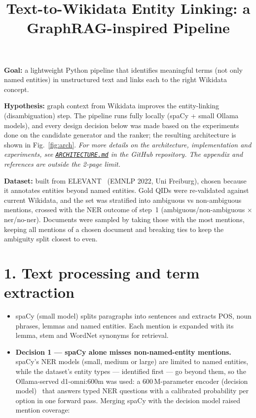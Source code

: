 \documentclass[10pt,a4paper]{article}
\title{\vspace{-1.4cm}\large\bfseries Text-to-Wikidata Entity Linking: a GraphRAG-inspired Pipeline}
\author{}
\date{}
\begin{document}
\maketitle
\vspace{-1.6cm}

\textbf{Goal:} a lightweight Python pipeline that identifies meaningful terms (not only named entities) in unstructured text and links each to the right Wikidata concept. 

\textbf{Hypothesis:} graph context from Wikidata improves the entity-linking (disambiguation) step. The pipeline runs fully locally (spaCy + small Ollama models), and every design decision below was made based on the experiments done on the candidate generator and the ranker; the resulting architecture is shown in Fig.~\ref{fig:arch}. \emph{For more details on the architecture, implementation and experiments, see \href{https://github.com/itisha2/text-to-wikidata-linking/blob/main/ARCHITECTURE.md}{\texttt{ARCHITECTURE.md}} in the GitHub repository. The appendix and references are outside the 2-page limit.}

\textbf{Dataset:} built from ELEVANT~\cite{elevant} (EMNLP 2022, Uni Freiburg), chosen because it annotates entities beyond named entities. Gold QIDs were re-validated against current Wikidata, and the set was stratified into ambiguous vs non-ambiguous mentions, crossed with the NER outcome of step~1 (ambiguous/non-ambiguous $\times$ ner/no-ner). Documents were sampled by taking those with the most mentions, keeping all mentions of a chosen document and breaking ties to keep the ambiguity split closest to even.

\section*{1. Text processing and term extraction}
\begin{itemize}
  \item spaCy (small model) splits paragraphs into sentences and extracts POS, noun phrases, lemmas and named entities. Each mention is expanded with its lemma, stem and WordNet synonyms for retrieval.
  \item \textbf{Decision 1 --- spaCy alone misses non-named-entity mentions.} spaCy's NER models (small, medium or large) are limited to named entities, while the dataset's entity types --- identified first --- go beyond them, so the Ollama-served d1-omni:600m was used: a 600\,M-parameter encoder (decision model)~\cite{d1omni} that answers typed NER questions with a calibrated probability per option in one forward pass. Merging spaCy with the decision model raised mention coverage:
\end{itemize}
\end{document}
